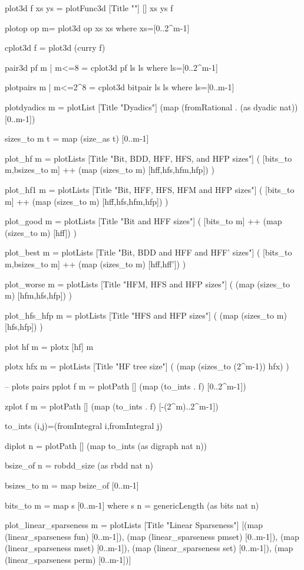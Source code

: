 \documentclass[]{INCLUDES/llncs}
\begin{document}
\begin{code}
plot3d f xs ys = plotFunc3d [Title ""] [] xs ys f

plotop op m= plot3d op xs xs where xs=[0..2^m-1]

cplot3d f = plot3d (curry f)

pair3d pf m | m<=8 = cplot3d pf ls ls where ls=[0..2^m-1]

plotpairs m | m<=2^8 = cplot3d bitpair ls ls where ls=[0..m-1]

plotdyadics m = plotList 
  [Title "Dyadics"] 
  (map (fromRational . (as dyadic nat)) [0..m-1])

sizes_to m t = map (size_as t) [0..m-1]

plot_hf m = plotLists [Title "Bit, BDD, HFF, HFS, and HFP sizes"] 
  ( 
    [bits_to m,bsizes_to m] ++ 
    (map (sizes_to m) [hff,hfs,hfm,hfp])
  )

plot_hf1 m = plotLists [Title "Bit, HFF, HFS, HFM and HFP sizes"] 
  ( 
    [bits_to m] ++ 
    (map (sizes_to m) [hff,hfs,hfm,hfp])
  )
  
plot_good m = plotLists [Title "Bit and HFF sizes"] 
  ( 
    [bits_to m] ++ 
    (map (sizes_to m) [hff])
  )
  
plot_best m = plotLists [Title "Bit, BDD and HFF and HFF' sizes"] 
  ( 
    [bits_to m,bsizes_to m] ++ 
    (map (sizes_to m) [hff,hff'])
  )

plot_worse m = plotLists [Title "HFM, HFS and HFP sizes"] 
  ( 
    (map (sizes_to m) [hfm,hfs,hfp])
  )

plot_hfs_hfp m = plotLists [Title "HFS and HFP sizes"] 
  ( 
    (map (sizes_to m) [hfs,hfp])
  )
  
plot hf m = plotx [hf] m

plotx hfx m = plotLists [Title "HF tree size"] 
  ( 
    (map (sizes_to (2^m-1)) hfx)
  )

-- plots pairs
pplot f m = plotPath [] (map (to_ints . f) [0..2^m-1]) 

zplot f m = plotPath [] (map (to_ints . f) [-(2^m)..2^m-1]) 

to_ints (i,j)=(fromIntegral i,fromIntegral j)

diplot n = plotPath [] (map to_ints (as digraph nat n))

bsize_of n = robdd_size (as rbdd nat n)

bsizes_to m = map bsize_of [0..m-1]

bits_to m = map s [0..m-1] where s n = genericLength (as bits nat n)

plot_linear_sparseness m = plotLists [Title "Linear Sparseness"] 
  [(map (linear_sparseness fun) [0..m-1]),
   (map (linear_sparseness pmset) [0..m-1]),
   (map (linear_sparseness mset) [0..m-1]),
   (map (linear_sparseness set) [0..m-1]),
   (map (linear_sparseness perm) [0..m-1])]



\end{code}
\end{document}
